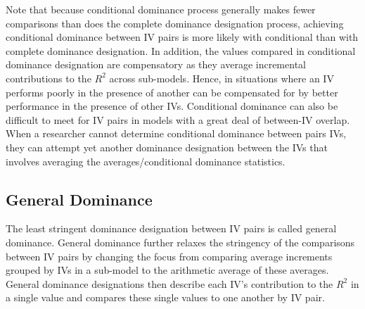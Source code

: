 \documentclass[ShortAfour,times,sageapa]{sagej}
\begin{document}
	Note that because conditional dominance process generally makes fewer comparisons than does the complete dominance designation process, achieving conditional dominance between IV pairs is more likely with conditional than with complete dominance designation. 
	In addition, the values compared in conditional dominance designation are compensatory as they average incremental contributions to the $R^2$ across sub-models.
	Hence, in situations where an IV performs poorly in the presence of another can be compensated for by better performance in the presence of other IVs. 
	Conditional dominance can also be difficult to meet for IV pairs in models with a great deal of between-IV overlap.
	When a researcher cannot determine conditional dominance between pairs IVs, they can attempt yet another dominance designation between the IVs that involves averaging the averages/conditional dominance statistics.
	
	\subsection{General Dominance}
	
	The least stringent dominance designation between IV pairs is called general dominance.
	General dominance further relaxes the stringency of the comparisons between IV pairs by changing the focus from comparing average increments grouped by IVs in a sub-model to the arithmetic average of these averages.
	General dominance designations then describe each IV's contribution to the $R^2$ in a single value and compares these single values to one another by IV pair.
	
\end{document}
